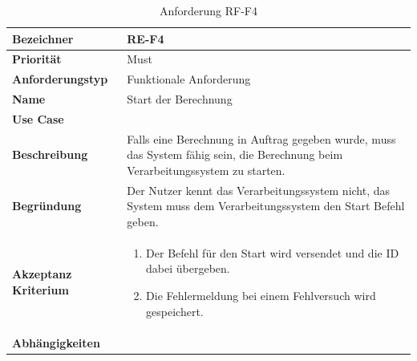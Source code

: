 \begin{table}[ht]
\centering
  \begin{tabular}{ l | p{8cm} }
	\hline
	\rowcolor{gray}
	\textbf{Bezeichner}&	\textbf{RE-F4}\\ \hline
	\textbf{Priorität} 		&	Must\\ \hline
	\textbf{Anforderungstyp}	&	Funktionale Anforderung\\ \hline
	\textbf{Name} 			&	Start der Berechnung\\ \hline
	\textbf{Use Case} 		&	\nameref{table:use_case_2}\\ \hline
	\textbf{Beschreibung} 	&	Falls eine Berechnung in Auftrag gegeben wurde, muss das System fähig sein, die Berechnung beim Verarbeitungssystem zu starten.\\ \hline
	\textbf{Begründung} 		&	Der Nutzer kennt das Verarbeitungssystem nicht, das System muss dem Verarbeitungssystem den Start Befehl geben.\\ \hline
	\textbf{Akzeptanz Kriterium}	&	\begin{enumerate}
					\item Der Befehl für den Start wird versendet und die ID dabei übergeben.
					\item Die Fehlermeldung bei einem Fehlversuch wird gespeichert.
					\end{enumerate}
					\\ \hline
	\textbf{Abhängigkeiten} 	&	\nameref{table:req_3}\\ \hline
  \end{tabular}
   \caption{Anforderung RF-F4}\label{table:req_4}
\end{table}

